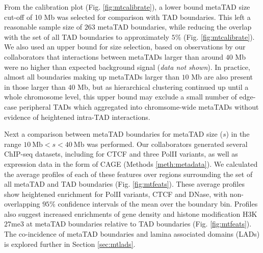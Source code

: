 \documentclass[a4paper,11pt,oneside]{book}
\begin{document}
From the calibration plot (Fig. \ref{fig:mtcalibrate}), a lower bound metaTAD size cut-off of 10 Mb was selected for comparison with TAD boundaries. This left a reasonable sample size of $263$ metaTAD boundaries, while reducing the overlap with the set of all TAD boundaries to approximately $5\%$ (Fig. \ref{fig:mtcalibrate}). We also used an upper bound for size selection, based on observations by our collaborators that interactions between metaTADs larger than around $40$ Mb were no higher than expected background signal (\emph{data not shown}). In practice, almost all boundaries making up metaTADs larger than $10$ Mb are also present in those larger than $40$ Mb, but as hierarchical clustering continued up until a whole chromosome level, this upper bound may exclude a small number of edge-case peripheral TADs which aggregated into chromsome-wide metaTADs without evidence of heightened intra-TAD interactions.

Next a comparison between metaTAD boundaries for metaTAD size ($s$) in the range $10~\textrm{Mb} < s < 40~\textrm{Mb}$ was performed. Our collaborators generated several ChIP-seq datasets, including for CTCF and three PolII variants, as well as expression data in the form of CAGE (Methods \ref{meth:metadata}). We calculated the average profiles of each of these features over regions surrounding the set of all metaTAD and TAD boundaries (Fig. \ref{fig:mtfeats}). These average profiles show heightened enrichment for PolII variants, CTCF and DNase, with non-overlapping $95\%$ confidence intervals of the mean over the boundary bin. Profiles also suggest increased enrichments of gene density and histone modification H$3$K$27$me$3$ at metaTAD boundaries relative to TAD boundaries (Fig. \ref{fig:mtfeats}). The co-incidence of metaTAD boundaries and lamina associated domains (LADs) is explored further in Section \ref{sec:mtlads}.
\end{document}

